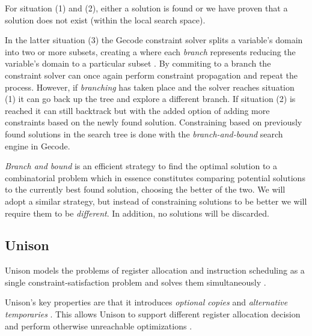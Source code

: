 For situation (1) and (2), either a solution is found or we have proven that a solution
does not exist (within the local search space).

In the latter situation (3) the Gecode constraint solver splits a variable's domain into
two or more subsets, creating a  where each \textit{branch} represents
reducing the variable's domain to a particular subset \cite[Section~8]{MPG}. By commiting
to a branch the constraint solver can once again perform constraint propagation and repeat
the process. However, if \textit{branching} has taken place and the solver reaches
situation (1) it can go back up the tree and explore a different branch. If situation (2)
is reached it can still backtrack but with the added option of adding more constraints
based on the newly found solution. Constraining based on previously found solutions in the
search tree is done with the \textit{branch-and-bound} search engine\cite[Section~9]{MPG}
in Gecode.

\textit{Branch and bound} is an efficient strategy to find the optimal solution to a
combinatorial problem which in essence constitutes comparing potential solutions to the
currently best found solution, choosing the better of the two\cite{BaB}. We will adopt a
similar strategy, but instead of constraining solutions to be better we will require them
to be \textit{different}. In addition, no solutions will be discarded.

\subsection{Unison}


Unison models the problems of register allocation and instruction scheduling as a single
constraint-satisfaction problem and solves them simultaneously \cite{unison-docs,reg-alloc-inst-sched-uni}.

Unison's key properties are that it introduces \textit{optional copies} and
\textit{alternative temporaries} \cite{reg-alloc-inst-sched-uni}. This allows Unison to
support different register allocation decision and perform otherwise unreachable optimizations
\cite{reg-alloc-inst-sched-uni, comb-spill}.
